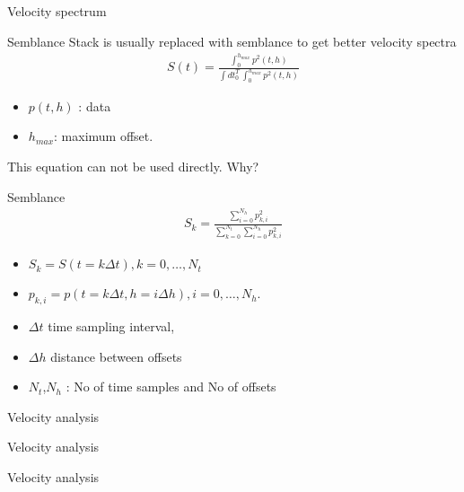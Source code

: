 \begin{frame}{Velocity spectrum}
\end{frame}
\begin{frame}{Semblance}
Stack is usually replaced with semblance to
get better velocity spectra  
\begin{eqnarray}
S(t) = \frac{\int_0^{h_{max}} p^2(t,h)}{\int dt_0^T\, \int_0^{h_{max}} p^2(t,h)}
\end{eqnarray}
\begin{itemize}
 \item $p(t,h)$ : data 
 \item $h_{max}$: maximum offset. 
\end{itemize}
This equation can not be used directly.  Why?
\end{frame}
%
\begin{frame}{Semblance}
\begin{eqnarray}
S_k = \frac{\sum_{i=0}^{N_h} p^2_{k,i}}{\sum_{k=0}^{N_t} \sum_{i=0}^{N_h} p^2_{k,i}}
\end{eqnarray}
\begin{itemize}
 \item $S_k = S(t=k\Delta t), k=0,\ldots,N_t$ 
 \item $p_{k,i}=p(t=k\Delta t,h=i\Delta h), i=0,\ldots,N_h$. 
 \item $\Delta t$ time sampling interval, 
 \item $\Delta h$ distance between offsets \item $N_t$,$N_h$ :
No of time samples and No of  offsets
\end{itemize}
\end{frame}
\begin{frame}{Velocity analysis}
\end{frame}
\begin{frame}{Velocity analysis}
\end{frame}
\begin{frame}{Velocity analysis}
\end{frame}
